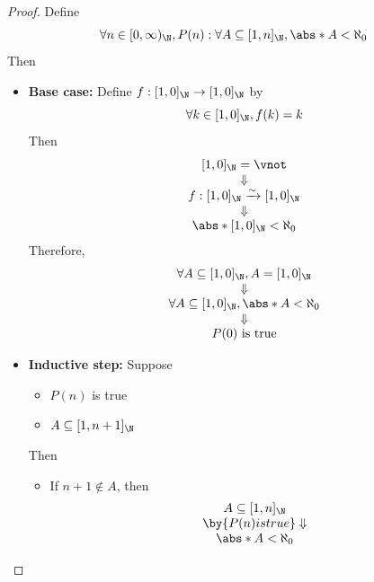 \begin{proof}
  Define
  \[
    \forall n \in [0, \infty)_{\N}, P(n): \forall A \subseteq [1, n]_{\N}, \abs*{A} < \aleph_{0}
  \]
  Then
  \begin{itemize}
    \item \textbf{Base case:} Define $f: [1, 0]_{\N} \to [1, 0]_{\N}$ by
          \[
            \forall k \in [1, 0]_{\N}, f(k) = k
          \]
          Then
          \[
            \begin{array}{c}
              [1, 0]_{\N} = \vnot                           \\
              \Downarrow                                    \\
              f: [1, 0]_{\N} \xrightarrow{\sim} [1, 0]_{\N} \\
              \Downarrow                                    \\
              \abs*{[1, 0]_{\N}} < \aleph_{0}
            \end{array}
          \]
          Therefore,
          \[
            \begin{array}{c}
              \forall A \subseteq [1, 0]_{\N}, A = [1, 0]_{\N}       \\
              \Downarrow                                             \\
              \forall A \subseteq [1, 0]_{\N}, \abs*{A} < \aleph_{0} \\
              \Downarrow                                             \\
              P(0) \text{ is true}
            \end{array}
          \]
    \item \textbf{Inductive step:} Suppose
          \begin{itemize}
            \item $P(n)$ is true
            \item $A \subseteq [1, n + 1]_{\N}$
          \end{itemize}
          Then
          \begin{itemize}
            \item If $n + 1 \notin A$, then
                  \[
                    \begin{array}{c}
                      A \subseteq [1, n]_{\N}                   \\
                      \by{\ensuremath{P(n)} is true} \Downarrow \\
                      \abs*{A} < \aleph_{0}                     \\

\end{array}\]
\end{itemize}
\end{itemize}
\end{proof}
